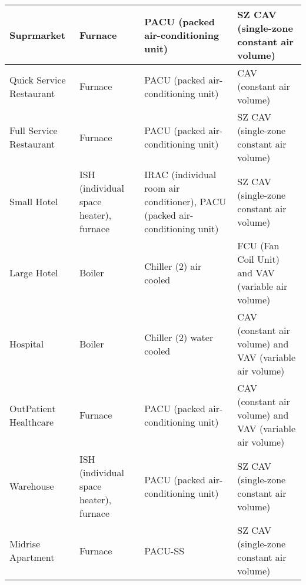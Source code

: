 \documentclass[hidelinks,12pt]{article}
\begin{document}
\begin{table}[h!]
\begin{longtable}{l|p{3cm}|p{4cm}|p{4cm}}
  \hline
  Suprmarket               & Furnace                                & PACU (packed air-conditioning unit)                                         & SZ CAV (single-zone constant air volume)                \\
  \hline
  Quick Service Restaurant & Furnace                                & PACU (packed air-conditioning unit)                                         & CAV (constant air volume)                               \\
  \hline
  Full Service Restaurant  & Furnace                                & PACU (packed air-conditioning unit)                                         & SZ CAV (single-zone constant air volume)                \\
  \hline
  Small Hotel              & ISH (individual space heater), furnace & IRAC (individual room air conditioner), PACU (packed air-conditioning unit) & SZ CAV (single-zone constant air volume)                \\
  \hline
  Large Hotel              & Boiler                                 & Chiller (2) air cooled                                                      & FCU (Fan Coil Unit) and VAV (variable air volume)       \\
  \hline
  Hospital                 & Boiler                                 & Chiller (2) water cooled                                                    & CAV (constant air volume) and VAV (variable air volume) \\
  \hline
  OutPatient Healthcare    & Furnace                                & PACU (packed air-conditioning unit)                                         & CAV (constant air volume) and VAV (variable air volume) \\
  \hline
  Warehouse                & ISH (individual space heater), furnace & PACU (packed air-conditioning unit)                                         & SZ CAV (single-zone constant air volume)                \\
  \hline
  Midrise Apartment        & Furnace                                & PACU-SS                                                                     & SZ CAV (single-zone constant air volume)               \\
  \hline
\end{longtable}
\end{table}

\pagebreak
\end{document}
